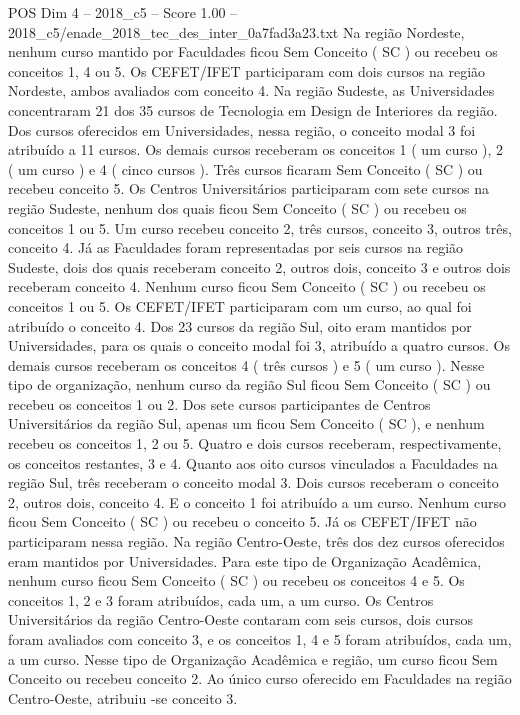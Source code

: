 \begin{textsample}{POS Dim 4 – 2018\_c5 – Score 1.00 – 2018\_c5/enade\_2018\_tec\_des\_inter\_0a7fad3a23.txt}
Na região Nordeste, nenhum curso mantido por Faculdades ficou Sem Conceito ( SC ) ou recebeu os conceitos 1, 4 ou 5.
Os CEFET/IFET participaram com dois cursos na região Nordeste, ambos avaliados com conceito 4.
Na região Sudeste, as Universidades concentraram 21 dos 35 cursos de Tecnologia em Design de Interiores da região.
Dos cursos oferecidos em Universidades, nessa região, o conceito modal 3 foi atribuído a 11 cursos.
Os demais cursos receberam os conceitos 1 ( um curso ), 2 ( um curso ) e 4 ( cinco cursos ).
Três cursos ficaram Sem Conceito ( SC ) ou recebeu conceito 5.
Os Centros Universitários participaram com sete cursos na região Sudeste, nenhum dos quais ficou Sem Conceito ( SC ) ou recebeu os conceitos 1 ou 5.
Um curso recebeu conceito 2, três cursos, conceito 3, outros três, conceito 4.
Já as Faculdades foram representadas por seis cursos na região Sudeste, dois dos quais receberam conceito 2, outros dois, conceito 3 e outros dois receberam conceito 4.
Nenhum curso ficou Sem Conceito ( SC ) ou recebeu os conceitos 1 ou 5.
Os CEFET/IFET participaram com um curso, ao qual foi atribuído o conceito 4.
Dos 23 cursos da região Sul, oito eram mantidos por Universidades, para os quais o conceito modal foi 3, atribuído a quatro cursos.
Os demais cursos receberam os conceitos 4 ( três cursos ) e 5 ( um curso ).
Nesse tipo de organização, nenhum curso da região Sul ficou Sem Conceito ( SC ) ou recebeu os conceitos 1 ou 2.
Dos sete cursos participantes de Centros Universitários da região Sul, apenas um ficou Sem Conceito ( SC ), e nenhum recebeu os conceitos 1, 2 ou 5.
Quatro e dois cursos receberam, respectivamente, os conceitos restantes, 3 e 4.
Quanto aos oito cursos vinculados a Faculdades na região Sul, três receberam o conceito modal 3.
Dois cursos receberam o conceito 2, outros dois, conceito 4.
E o conceito 1 foi atribuído a um curso.
Nenhum curso ficou Sem Conceito ( SC ) ou recebeu o conceito 5.
Já os CEFET/IFET não participaram nessa região.
Na região Centro-Oeste, três dos dez cursos oferecidos eram mantidos por Universidades.
Para este tipo de Organização Acadêmica, nenhum curso ficou Sem Conceito ( SC ) ou recebeu os conceitos 4 e 5.
Os conceitos 1, 2 e 3 foram atribuídos, cada um, a um curso.
Os Centros Universitários da região Centro-Oeste contaram com seis cursos, dois cursos foram avaliados com conceito 3, e os conceitos 1, 4 e 5 foram atribuídos, cada um, a um curso.
Nesse tipo de Organização Acadêmica e região, um curso ficou Sem Conceito ou recebeu conceito 2.
Ao único curso oferecido em Faculdades na região Centro-Oeste, atribuiu -se conceito 3.

\end{textsample}
